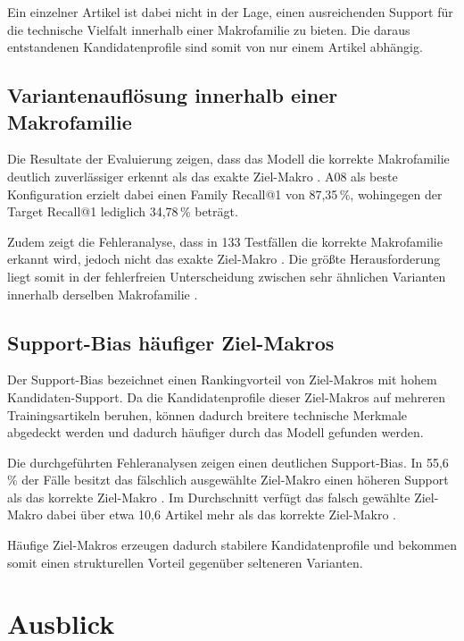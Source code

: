 Ein einzelner Artikel ist dabei nicht in der Lage, einen ausreichenden Support für die technische Vielfalt innerhalb einer Makrofamilie zu bieten.
Die daraus entstandenen Kandidatenprofile sind somit von nur einem Artikel abhängig.

\subsection{Variantenauflösung innerhalb einer Makrofamilie}

Die Resultate der Evaluierung zeigen, dass das Modell die korrekte Makrofamilie deutlich zuverlässiger erkennt als das exakte Ziel-Makro \parencite{EPLAN-Makros}.
A08 als beste Konfiguration erzielt dabei einen Family Recall@1 von 87,35\,\%, wohingegen der Target Recall@1 lediglich 34,78\,\% beträgt.

Zudem zeigt die Fehleranalyse, dass in 133 Testfällen die korrekte Makrofamilie erkannt wird, jedoch nicht das exakte Ziel-Makro \parencite{EPLAN-Makros}.
Die größte Herausforderung liegt somit in der fehlerfreien Unterscheidung zwischen sehr ähnlichen Varianten innerhalb derselben Makrofamilie \parencite{LTR_Configuration_Test_Series}.

\subsection{Support-Bias häufiger Ziel-Makros}

Der Support-Bias bezeichnet einen Rankingvorteil von Ziel-Makros mit hohem Kandidaten-Support. Da die Kandidatenprofile dieser Ziel-Makros auf mehreren Trainingsartikeln beruhen, können dadurch breitere technische Merkmale abgedeckt werden und dadurch häufiger durch das Modell gefunden werden.

Die durchgeführten Fehleranalysen zeigen einen deutlichen Support-Bias. In 55,6\,\% der Fälle besitzt das fälschlich ausgewählte Ziel-Makro \parencite{EPLAN-Makros} einen höheren Support als das korrekte Ziel-Makro \parencite{EPLAN-Makros}.
Im Durchschnitt verfügt das falsch gewählte Ziel-Makro dabei über etwa 10,6 Artikel mehr als das korrekte Ziel-Makro \parencite{LTR_Configuration_Test_Series}.

Häufige Ziel-Makros \parencite{EPLAN-Makros} erzeugen dadurch stabilere Kandidatenprofile und bekommen somit einen strukturellen Vorteil gegenüber selteneren Varianten.


\section{Ausblick}

